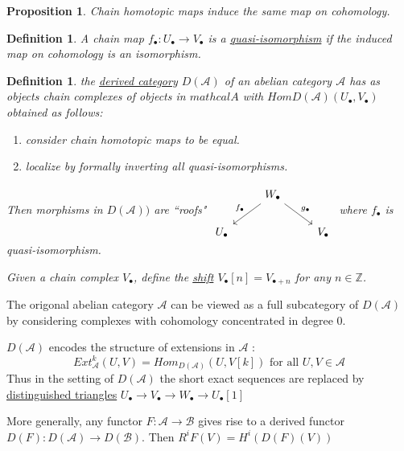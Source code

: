 \documentclass{book}
\newtheorem{prop}[theorem]{Proposition}
\newtheorem{definition}[theorem]{Definition}
\begin{document}
\begin{prop}
Chain homotopic maps induce the same map on cohomology. 
\end{prop}

\begin{definition}
A chain map $f_{\bullet} : U_{\bullet} \rightarrow V_{\bullet}$ is a \underline{quasi-isomorphism} if the induced map on cohomology is an isomorphism. 
\end{definition}

\begin{definition}
the \underline{derived category} $D(\mathcal{A})$ of an abelian category $\mathcal{A}$ has as objects chain complexes of objects in $mathcal{A}$ with $Hom{D(\mathcal{A})}(U_{\bullet}, V_{\bullet})$ obtained as follows:
\begin{enumerate}
\item consider chain homotopic maps to be equal.
\item localize by formally inverting all quasi-isomorphisms.
\end{enumerate}
Then morphisms in $D(\mathcal{A}))$ are ``roofs" $\begin{tikzcd}
         &W_{\bullet} \arrow[dr ,"g_{\bullet}"] \arrow[dl ,"f_{\bullet}"']  &   \\
	U_{\bullet}  &  & V_{\bullet}
            \end{tikzcd}$
where $f_{\bullet}$ is quasi-isomorphism.

Given a chain complex $V_{\bullet}$, define the \underline{shift} $V_{\bullet}[n] =V_{\bullet+n}$ for any $n\in \mathbb{Z}$.
\end{definition}
 
The origonal abelian category $\mathcal{A}$ can be viewed as a full subcategory of $D(\mathcal{A})$ by considering complexes with cohomology concentrated in degree 0. 

$D(\mathcal{A})$ encodes the structure of extensions in $\mathcal{A}$ :
$$Ext^k_{\mathcal{A}}(U,V) = Hom_{D(\mathcal{A})}(U,V[k]) \text{    for all     } U,V\in \mathcal{A}$$
Thus in the setting of $D(\mathcal{A})$ the short exact sequences are replaced by \underline{distinguished triangles} $U_{\bullet}\rightarrow V_{\bullet} \rightarrow W_{\bullet} \rightarrow U_{\bullet}[1]$

More generally, any functor $F:\mathcal{A} \rightarrow \mathcal{B} $ gives rise to a derived functor $D(F): D(\mathcal{A})\rightarrow D(\mathcal{B})$. Then $R^iF(V)=H^i(D(F)(V))$
\end{document}
